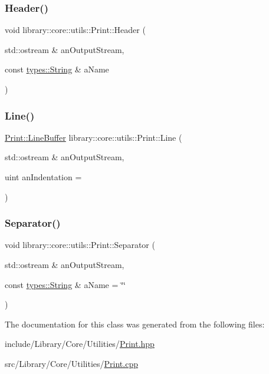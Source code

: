 \subsubsection{\texorpdfstring{Header()}{Header()}}
{\footnotesize\ttfamily void library\+::core\+::utils\+::\+Print\+::\+Header (\begin{DoxyParamCaption}\item[{std\+::ostream \&}]{an\+Output\+Stream,  }\item[{const \hyperlink{classlibrary_1_1core_1_1types_1_1_string}{types\+::\+String} \&}]{a\+Name }\end{DoxyParamCaption})\hspace{0.3cm}{\ttfamily [static]}}

\mbox{\label{classlibrary_1_1core_1_1utils_1_1_print_ab4d98c65fbb58213358df534dd1f6d65}} 
\subsubsection{\texorpdfstring{Line()}{Line()}}
{\footnotesize\ttfamily \hyperlink{classlibrary_1_1core_1_1utils_1_1_print_1_1_line_buffer}{Print\+::\+Line\+Buffer} library\+::core\+::utils\+::\+Print\+::\+Line (\begin{DoxyParamCaption}\item[{std\+::ostream \&}]{an\+Output\+Stream,  }\item[{uint}]{an\+Indentation = {} }\end{DoxyParamCaption})\hspace{0.3cm}{\ttfamily [static]}}

\mbox{\label{classlibrary_1_1core_1_1utils_1_1_print_a2c2f28c75ecbee13ea972f49ea4a3adb}} 
\subsubsection{\texorpdfstring{Separator()}{Separator()}}
{\footnotesize\ttfamily void library\+::core\+::utils\+::\+Print\+::\+Separator (\begin{DoxyParamCaption}\item[{std\+::ostream \&}]{an\+Output\+Stream,  }\item[{const \hyperlink{classlibrary_1_1core_1_1types_1_1_string}{types\+::\+String} \&}]{a\+Name = {\ttfamily \char`\"{}\char`\"{}} }\end{DoxyParamCaption})\hspace{0.3cm}{\ttfamily [static]}}



The documentation for this class was generated from the following files\+:\begin{DoxyCompactItemize}
\item 
include/\+Library/\+Core/\+Utilities/\hyperlink{_print_8hpp}{Print.\+hpp}\item 
src/\+Library/\+Core/\+Utilities/\hyperlink{_print_8cpp}{Print.\+cpp}\end{DoxyCompactItemize}
